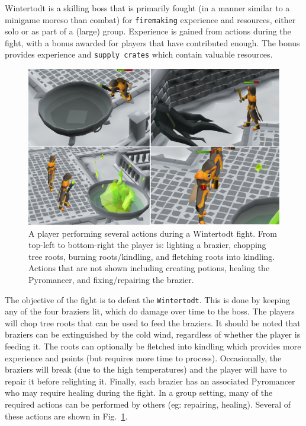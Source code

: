 Wintertodt is a skilling boss that is primarily fought (in a manner similar to a minigame moreso than combat) for \texttt{firemaking} experience and resources, either solo or as part of a (large) group. Experience is gained from actions during the fight, with a bonus awarded for players that have contributed enough. The bonus provides experience and \texttt{supply crates} which contain valuable resources.

\begin{figure}
	\centering
	\includegraphics[width=\linewidth]{img/firemaking/wintertodt_actions.png}
	\caption{
		A player performing several actions during a Wintertodt fight. From top-left to bottom-right the player is: lighting a brazier, chopping tree roots, burning roots/kindling, and fletching roots into kindling. Actions that are not shown including creating potions, healing the Pyromancer, and fixing/repairing the brazier.
	}
	\label{fig:wintertodt_actions}
\end{figure}

The objective of the fight is to defeat the \texttt{Wintertodt}. This is done by keeping any of the four braziers lit, which do damage over time to the boss. The players will chop tree roots that can be used to feed the braziers. It should be noted that braziers can be extinguished by the cold wind, regardless of whether the player is feeding it. The roots can optionally be fletched into kindling which provides more experience and points (but requires more time to process). Occasionally, the braziers will break (due to the high temperatures) and the player will have to repair it before relighting it. Finally, each brazier has an associated Pyromancer who may require healing during the fight. In a group setting, many of the required actions can be performed by others (eg: repairing, healing). Several of these actions are shown in Fig.~\ref{fig:wintertodt_actions}.

